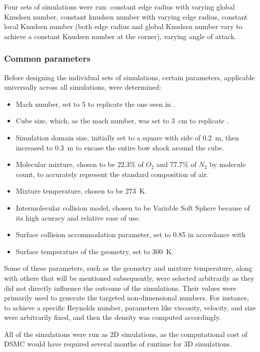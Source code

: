 Four sets of simulations were run: constant edge radius with varying global Knudsen number, constant knudsen number with varying edge radius, constant local Knudsen number (both edge radius and global Knudsen number vary to achieve a constant Knudsen number at the corner), varying angle of attack.

\subsubsection{Common parameters}
Before designing the individual sets of simulations, certain parameters, applicable universally across all simulations, were determined:
\begin{itemize}
    \item Mach number, set to 5 to replicate the one seen in \cite{rees}.
    \item Cube size, which, as the mach number, was set to \qty{3}{\cm} to replicate \cite{rees}.
    \item Simulation domain size, initially set to a square with side of \qty{0.2}{\m}, then increased to \qty{0.3}{\m} to encase the entire bow shock around the cube.
    \item Molecular mixture, chosen to be 22.3\% of $O_{2}$ and 77.7\% of $N_{2}$ by molecule count, to accurately represent the standard composition of air.
    \item Mixture temperature, chosen to be \qty{273}{\kelvin}.
    \item Intermolecular collision model, chosen to be Variable Soft Sphere because of its high acuracy and relative ease of use.
    \item Surface collision accommodation parameter, set to 0.85 in accordance with \cite{accomod}
    \item Surface temperature of the geometry, set to \qty{300}{\kelvin}.
\end{itemize}

Some of these parameters, such as the geometry and mixture temperature, along with others that will be mentioned subsequently, were selected arbitrarily as they did not directly influence the outcome of the simulations. Their values were primarily used to generate the targeted non-dimensional numbers. For instance, to achieve a specific Reynolds number, parameters like viscosity, velocity, and size were arbitrarily fixed, and then the density was computed accordingly.

All of the simulations were run as 2D simulations, as the computational cost of DSMC would have required several months of runtime for 3D simulations.

